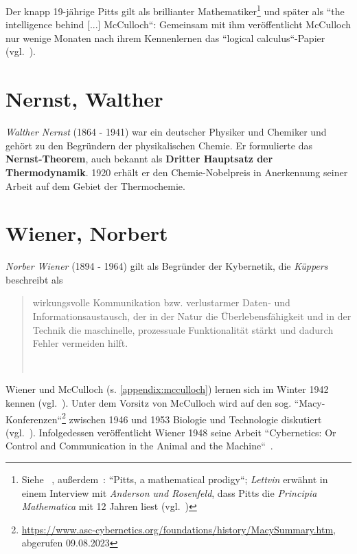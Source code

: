 Der knapp 19-jährige Pitts gilt als brillianter Mathematiker\footnote{
    Siehe ~\cite[4]{Arb19}, außerdem~\cite[22]{Abr02}: ``Pitts, a mathematical prodigy``;
    \textit{Lettvin} erwähnt in einem Interview mit \textit{Anderson und Rosenfeld}, dass Pitts die \textit{Principia Mathematica} mit 12 Jahren liest (vgl.~\cite[2]{AR98})
} und später als ``the intelligence behind [...] McCulloch``: Gemeinsam mit ihm veröffentlicht McCulloch nur wenige Monaten nach ihrem Kennenlernen das ``logical calculus``-Papier (vgl.~\cite[104]{AR98}).


\section{Nernst, Walther}\label{appendix:nernst}
\textit{Walther Nernst} (1864 - 1941) war ein deutscher Physiker und Chemiker und gehört zu den Begründern der physikalischen Chemie.
Er formulierte das \textbf{Nernst-Theorem}, auch bekannt als \textbf{Dritter Hauptsatz der Thermodynamik}.
1920 erhält er den Chemie-Nobelpreis in Anerkennung seiner Arbeit auf dem Gebiet der Thermochemie.




\section{Wiener, Norbert}\label{appendix:wiener}

\textit{Norber Wiener} (1894 - 1964) gilt als Begründer der Kybernetik, die \textit{Küppers} beschreibt als

\blockquote[{~\cite[2]{Kup19}}]{
    wirkungsvolle Kommunikation bzw. verlustarmer Daten- und Informationsaustausch, der in der Natur die Überlebensfähigkeit und in der Technik die maschinelle, prozessuale Funktionalität stärkt und dadurch Fehler vermeiden hilft.
}

Wiener und McCulloch (s. \ref{appendix:mcculloch}) lernen sich im Winter 1942 kennen (vgl.~\cite[218]{Mas90}).
Unter dem Vorsitz von McCulloch wird auf den sog. ``Macy-Konferenzen``\footnote{
    \url{https://www.asc-cybernetics.org/foundations/history/MacySummary.htm}, abgerufen 09.08.2023
} zwischen 1946 und 1953 Biologie und Technologie diskutiert (vgl.~\cite[5]{Arb19}).
Infolgedessen veröffentlicht Wiener 1948 seine Arbeit ``Cybernetics: Or Control and Communication in the Animal and the Machine``~\cite{Wie48}.
